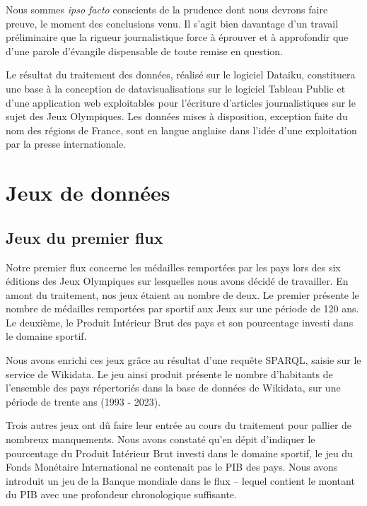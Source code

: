 \documentclass[hidelinks, 12pt]{report}
\begin{document}
Nous sommes \textit{ipso facto} conscients de la prudence dont nous devrons faire preuve, le moment des conclusions venu. Il s'agit bien davantage d'un travail préliminaire que la rigueur journalistique force à éprouver et à approfondir que d'une parole d'évangile dispensable de toute remise en question.

Le résultat du traitement des données, réalisé sur le logiciel Dataiku, constituera une base à la conception de datavisualisations sur le logiciel Tableau Public et d'une application web exploitables pour l'écriture d'articles journalistiques sur le sujet des Jeux Olympiques. Les données mises à disposition, exception faite du nom des régions de France, sont en langue anglaise dans l'idée d'une exploitation par la presse internationale.





%





\chapter{Jeux de données}

\section{Jeux du premier flux}

Notre premier flux concerne les médailles remportées par les pays lors des six éditions des Jeux Olympiques sur lesquelles nous avons décidé de travailler. En amont du traitement, nos jeux étaient au nombre de deux. Le premier présente le nombre de médailles remportées par sportif aux Jeux sur une période de 120 ans\autocite{kaggle}. Le deuxième, le Produit Intérieur Brut des pays et son pourcentage investi dans le domaine sportif\autocite{fmi}.

Nous avons enrichi ces jeux grâce au résultat d'une requête SPARQL, saisie sur le service de Wikidata. Le jeu ainsi produit présente le nombre d'habitants de l'ensemble des pays répertoriés dans la base de données de Wikidata, sur une période de trente ans (1993 - 2023)\autocite{wikiquerypop}.

Trois autres jeux ont dû faire leur entrée au cours du traitement pour pallier de nombreux manquements. Nous avons constaté qu'en dépit d'indiquer le pourcentage du Produit Intérieur Brut investi dans le domaine sportif, le jeu du Fonds Monétaire International ne contenait pas le PIB des pays. Nous avons introduit un jeu de la Banque mondiale\autocite{worldbank} dans le flux -- lequel contient le montant du PIB avec une profondeur chronologique suffisante.
\end{document}
